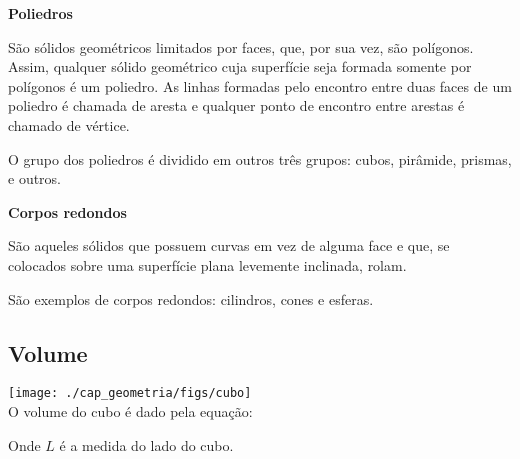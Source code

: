 \begin{figure}[H]
\center
{}
\qquad
{}
\end{figure}

\begin{figure}[H]
\center
{}
\qquad
{}
\end{figure}

\begin{figure}[H]
\center
{}
\qquad
{}
\end{figure}


 \textbf{Poliedros}

 São sólidos geométricos limitados por faces, que, por sua vez, são polígonos. Assim, qualquer sólido geométrico cuja superfície seja formada somente por polígonos é um poliedro. As linhas formadas pelo encontro entre duas faces de um poliedro é chamada de aresta e qualquer ponto de encontro entre arestas é chamado de vértice.

O grupo dos poliedros é dividido em outros três grupos: cubos, pirâmide, prismas, e outros.

\textbf{Corpos redondos}

São aqueles sólidos que possuem curvas em vez de alguma face e que, se colocados sobre uma superfície plana levemente inclinada, rolam.

São exemplos de corpos redondos: cilindros, cones e esferas.

\subsection{Volume}

\begin{multicols}{2}
 \texttt{[image: ./cap\_geometria/figs/cubo]} \\

 O volume do cubo é dado pela equação:
 
 
 Onde $L$ é a medida do lado do cubo.
\end{multicols}

